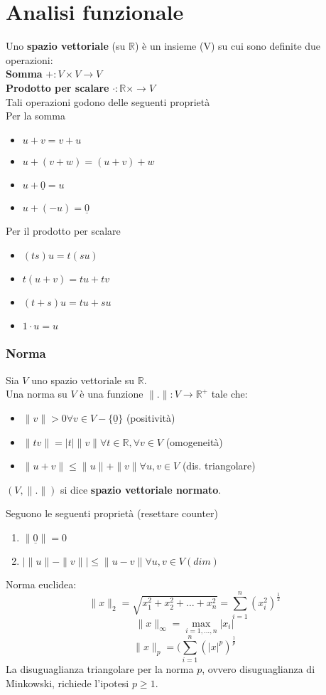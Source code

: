 \documentclass[a4paper]{article}
\newcommand{\R}{\mathbb{R}}
\begin{document}
\section{Analisi funzionale}
Uno \textbf{spazio vettoriale} (su $\R$) è un insieme (V) su cui sono definite due operazioni:
\\\textbf{Somma} $+:V \times V\to V$
\\\textbf{Prodotto per scalare} $\cdot :\R \times \to V$
\\Tali operazioni godono delle seguenti proprietà
\\Per la somma
\begin{itemize}
	\item $u+v=v+u$ 
	\item $u+(v+w)=(u+v)+w$
	\item $u+\underline 0=u$
	\item $u+(-u)=\underline 0$
\end{itemize}
Per il prodotto per scalare
\begin{itemize}
	\item $(ts)u=t(su)$
	\item $t(u+v)=tu+tv$
	\item $(t+s)u=tu+su$
	\item $1\cdot u=u$
\end{itemize}
\subsubsection{Norma}
\begin{tcolorbox}
	Sia $V$ uno spazio vettoriale su $\R$.
	\\Una norma su $V$ è una funzione $\|.\|:V\to \R^+$ tale che:
	\begin{itemize}
		\item $\|v\|>0\forall v\in V-\{\underline 0\} $ (positività)
		\item $\|tv\|=|t|\|v\|\forall t\in\R,\forall v\in V$ (omogeneità)
		\item $\|u+v\|\le \|u\|+\|v\|\forall u,v\in V$ (dis. triangolare)
	\end{itemize}
\end{tcolorbox}
\begin{tcolorbox}
	$(V,\|.\|)$ si dice \textbf{spazio vettoriale normato}.
\end{tcolorbox}
Seguono le seguenti proprietà (resettare counter)
\begin{enumerate}
	\item $\|\underline 0\|=0$
	\item $| \|u\|-\|v\| |\le \|u-v\|\forall u,v\in V (dim)$
\end{enumerate}
Norma euclidea:
\[\|x\|_2=\sqrt{x_1^2+x_2^2+\ldots+x_n^2} =\sum_{i=1}^{n} (x_i^2)^\frac{1}{2}\]
\[\|x\|_\infty=\max_{i=1,\ldots,n}|x_i|\]
\[\|x\|_p=(\sum_{i=1}^{n}(|x|^p)^{\frac{1}{p}}\]
La disuguaglianza triangolare per la norma $p$, ovvero disuguaglianza di Minkowski, richiede l'ipotesi $p\ge 1$.
\end{document}
